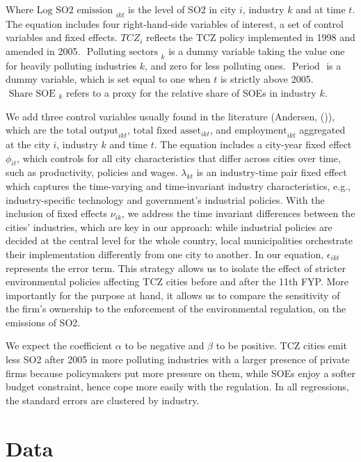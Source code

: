 \documentclass[12pt]{article}
\begin{document}
Where $\text {Log SO2 emission }_{i k t}$ is the level of SO2 in city $i$, industry $k$ and at time $t$. The equation includes four right-hand-side variables of interest, a set of control variables and fixed effects. $T C Z_{i}$ reflects the TCZ policy implemented in 1998 and amended in 2005. $\text {  Polluting sectors }_{k}$ is a dummy variable taking the value one for heavily polluting industries $k$, and zero for less polluting ones. $\text { Period }$ is a dummy variable, which is set equal to one when $t$ is strictly above 2005. $\text { Share SOE }_{k}$ refers to a proxy for the relative share of SOEs in industry $k$. 

We add three control variables usually found in the literature (Andersen, (\citeyear{Andersen2016-pa, Andersen2017-wf})), which are the $\text{total output}_{ikt}$, $\text{total fixed asset}_{ikt}$, and $\text{employment}_{ikt}$ aggregated at the city $i$, industry $k$ and time $t$. The equation includes a city-year fixed effect $\phi_{it}$, which controls for all city characteristics that differ across cities over time, such as productivity, policies and wages. $\lambda_{kt}$ is an industry-time pair fixed effect which captures the time-varying and time-invariant industry characteristics, e.g., industry-specific technology and government's industrial policies. With the inclusion of fixed effects $\nu_{ik}$, we address the time invariant differences between the cities’ industries, which are key in our approach: while industrial policies are decided at the central level for the whole country, local municipalities orchestrate their implementation differently from one city to another. In our equation, $\epsilon_{ikt}$ represents the error term. This strategy allows us to isolate the effect of stricter environmental policies affecting TCZ cities before and after the 11th FYP. More importantly for the purpose at hand, it allows us to compare the sensitivity of the firm’s ownership to the enforcement of the environmental regulation, on the emissions of SO2.

We expect the coefficient $\alpha$ to be negative and $\beta$ to be positive. TCZ cities emit less SO2 after 2005 in more polluting industries with a larger presence of private firms because policymakers put more pressure on them, while SOEs enjoy a softer budget constraint, hence cope more easily with the regulation. In all regressions, the standard errors are clustered by industry.

\section{Data} \label{sec:data}
\end{document}

